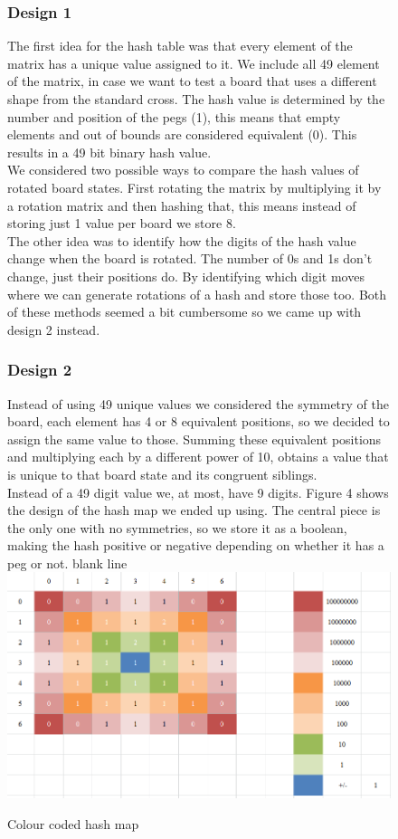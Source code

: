 \documentclass[11pt]{article}
\begin{document}
\newpage
\begin{figure}
\subsubsection*{Design 1}
The first idea for the hash table was that every element of the matrix has a unique value assigned to it. We include all 49 element of the matrix, in case we want to test a board that uses a different shape from the standard cross. The hash value is determined by the number and position of the pegs (1), this means that empty elements and out of bounds are considered equivalent (0). This results in a 49 bit binary hash value.\\ We considered two possible ways to compare the hash values of rotated board states. First rotating the matrix by multiplying it by a rotation matrix and then hashing that, this means instead of storing just 1 value per board we store 8.\\
The other idea was to identify how the digits of the hash value change when the board is rotated. The number of 0s and 1s don't change, just their positions do. By identifying which digit moves where we can generate rotations of a hash and store those too.
Both of these methods seemed a bit cumbersome so we came up with design 2 instead.
\subsubsection*{Design 2}
Instead of using 49 unique values we considered the symmetry of the board, each element has 4 or 8 equivalent positions, so we decided to assign the same value to those. Summing these equivalent positions and multiplying each by a different power of 10, obtains a value that is unique to that board state and its congruent siblings.\\
Instead of a 49 digit value we, at most, have 9 digits.
Figure 4 shows the design of the hash map we ended up using. The central piece is the only one with no symmetries, so we store it as a boolean, making the hash positive or negative depending on whether it has a peg or not.
\newline
\color{white} blank line\\
\color{black}
\includegraphics[width=\textwidth]{4}
\caption{Colour coded hash map} 
\label{fig: 3}
\end{figure}
\newpage
\end{document}
